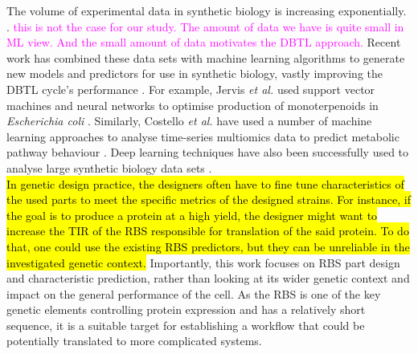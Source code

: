 \documentclass{article}
\newcommand{\mengyan}[1]{\textcolor{magenta}{#1}}
\begin{document}
The volume of experimental data in synthetic biology is increasing exponentially. \cite{Freemont2019}. 
\mengyan{this is not the case for our study. The amount of data we have is quite small in ML view. And the small amount of data motivates the DBTL approach. }
Recent work has combined these data sets with machine learning algorithms to generate new models and predictors for use in synthetic biology, vastly improving the DBTL cycle's performance \cite{Camacho2018,Radivojevic2020,LAWSON2021}. 
For example, Jervis \emph{et al.} used support vector machines and neural networks to optimise production of monoterpenoids in \emph{Escherichia coli} \cite{Jervis2019}.
Similarly, Costello \emph{et al.} have used a number of machine learning approaches to analyse time-series multiomics data to predict metabolic pathway behaviour \cite{Costello2018}. 
Deep learning techniques have also been successfully used to analyse large synthetic biology data sets \cite{Alipanahi2015,Angermueller2016,Hollerer2020}.\\

\hl{In genetic design practice, the designers often have to fine tune characteristics of the used parts to meet the specific metrics of the designed strains.
For instance, if the goal is to produce a protein at a high yield, the designer might want to increase the TIR of the RBS responsible for translation of the said protein.
To do that, one could use the existing RBS predictors, but they can be unreliable in the investigated genetic context.}
Importantly, this work focuses on RBS part design and characteristic prediction, rather than looking at its wider genetic context and impact on the general performance of the cell.
As the RBS is one of the key genetic elements controlling protein expression and has a relatively short sequence, it is a suitable target for establishing a workflow that could be potentially translated to more complicated systems.\\
\end{document}
